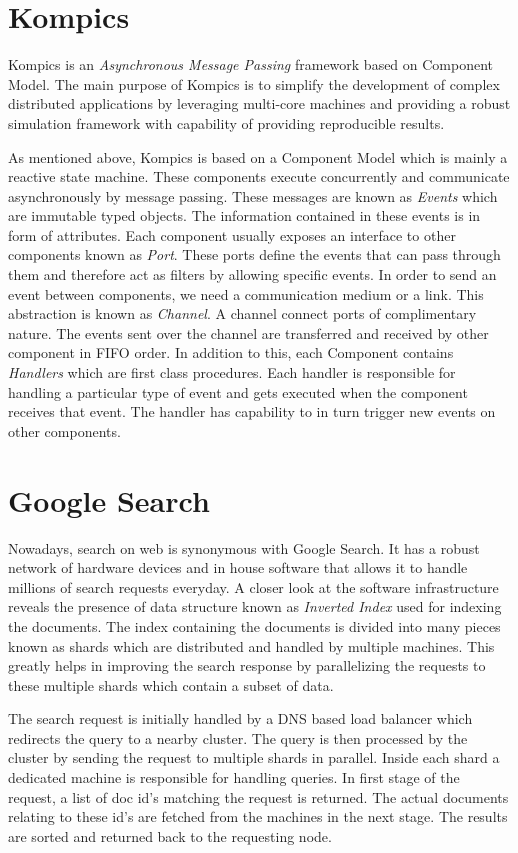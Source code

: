 \documentclass[12pt,a4paper,twoside,openright]{book}
\begin{document}
\section{Kompics}
Kompics \cite{kompics} is an \textit{Asynchronous Message Passing} framework based on Component Model. The main purpose of Kompics is to simplify the development of complex distributed applications by leveraging multi-core machines and providing a robust simulation framework with capability of providing reproducible results. 
\par As mentioned above, Kompics is based on a Component Model which is mainly a reactive state machine. These components execute concurrently and communicate asynchronously by message passing. These messages are known as \textit{Events} which are immutable typed objects. The information contained in these events is in form of attributes. Each component usually exposes an interface to other components known as \textit{Port}. These ports define the events that can pass through them and therefore act as filters by allowing specific events. In order to send an event between components, we need a communication medium or a link. This abstraction is known as \textit{Channel}. A channel connect ports of complimentary nature. The events sent over the channel are transferred and received by other component in FIFO order. In addition to this, each Component contains \textit{Handlers} which are first class procedures. Each handler is responsible for handling a particular type of event and gets executed when the component receives that event. The handler has capability to in turn trigger new events on other components. 


\section{Google Search}
Nowadays, search on web is synonymous with Google Search. It has a robust network of hardware devices and in house software that allows it to handle millions of search requests everyday. A closer look at the software infrastructure \cite{googleArchitecture} reveals the presence of data structure known as \textit{Inverted Index} used for indexing the documents. The index containing the documents is divided into many pieces known as shards which are distributed and handled by multiple machines. This greatly helps in improving the search response by parallelizing the requests to these multiple shards which contain a subset of data. 
\par The search request is initially handled by a DNS based load balancer which redirects the query to a nearby cluster. The query is then processed by the cluster by sending the request to multiple shards in parallel. Inside each shard a dedicated machine is responsible for handling queries. In first stage of the request, a list of doc id's matching the request is returned. The actual documents relating to these id's are fetched from the machines in the next stage. The results are sorted and returned back to the requesting node.
\end{document}
